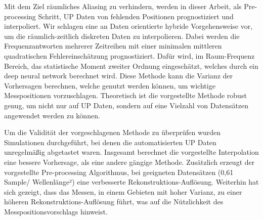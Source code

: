 Mit dem Ziel räumliches Aliasing zu verhindern, werden in dieser Arbeit, als Pre-processing Schritt, UP Daten von fehlenden Positionen prognostiziert und interpoliert. Wir schlagen eine an Daten orientierte hybride Vorgehensweise vor, um die räumlich-zeitlich diskreten Daten zu interpolieren. Dabei werden die Frequenzantworten mehrerer Zeitreihen mit einer minimalen mittleren quadratischen Fehlereinschätzung prognostiziert. Dafür wird, im Raum-Frequenz Bereich, das statistische Moment zweiter Ordnung eingeschätzt, welches durch ein deep neural network berechnet wird. Diese Methode kann die Varianz der Vorhersagen berechnen, welche genutzt werden können, um wichtige Messpositionen vorzuschlagen. Theoretisch ist die vorgestellte Methode robust genug, um nicht nur auf UP Daten, sondern auf eine Vielzahl von Datensätzen angewendet werden zu können. \par

Um die Validität der vorgeschlagenen Methode zu überprüfen wurden Simulationen durchgeführt, bei denen die automatisierten UP Daten unregelmäßig abgetastet waren. Insgesamt berechnet die vorgestellte Interpolation eine bessere Vorhersage, als eine andere gängige Methode. Zusätzlich erzeugt der vorgestellte Pre-processing Algorithmus, bei geeigneten Datensätzen (0,61 Sample/ Wellenlänge²) eine verbesserte Rekonstruktions-Auflösung. Weiterhin hat sich gezeigt, dass das Messen, in einem Gebieten mit hoher Varianz, zu einer höheren Rekonstruktions-Auflösung führt, was auf die Nützlichkeit des Messpositionsvorschlags hinweist. \par
